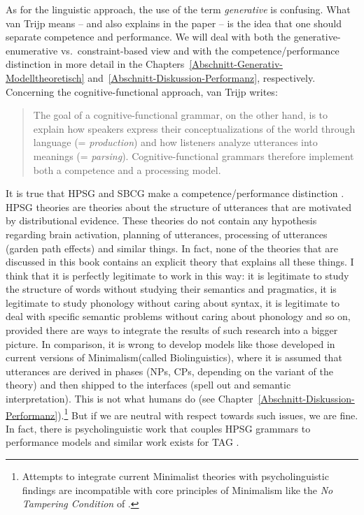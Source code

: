 \label{sec-performance-cxg}

As for the linguistic approach, the use of the term \emph{generative} is
confusing. What van Trijp means -- and also explains in the paper -- is the idea that one should
separate competence and performance. We will deal with both the generative-enumerative
vs.\ constraint-based view and with the competence/performance distinction in more detail in the
Chapters~\ref{Abschnitt-Generativ-Modelltheoretisch} and~\ref{Abschnitt-Diskussion-Performanz},
respectively. Concerning the cognitive-functional approach, van Trijp writes:
\begin{quote}
The goal of a cognitive-functional grammar, on the other hand, is to explain
how speakers express their conceptualizations of the world through language
(= \emph{production}) and how listeners analyze utterances into meanings (= \emph{parsing}).
Cognitive-functional grammars therefore implement both a competence and a
processing model. \citep[]{vanTrijp2013a}
\end{quote}
It is true that HPSG and SBCG make a competence/performance distinction \citep{SW2011a}. HPSG
theories are theories about the structure of utterances that are motivated by distributional
evidence. These theories do not contain any hypothesis regarding brain activation, planning of
utterances, processing of utterances (garden path effects) and similar things. In fact, none of the
theories that are discussed in this book contains an explicit theory that explains all these
things. I think that it is perfectly legitimate to work in this way: it is legitimate to study the
structure of words without studying their semantics and pragmatics, it is legitimate to study
phonology without caring about syntax, it is legitimate to deal with specific semantic problems
without caring about phonology and so on, provided there are ways to integrate the results of such
research into a bigger picture. In comparison, it is wrong to develop models like those developed in current
versions of Minimalism\indexmp (called Biolinguistics), where it is assumed that utterances are derived in
phases (NPs, CPs, depending on the variant of the theory) and then shipped to the interfaces (spell
out and semantic interpretation). This is not what humans do (see
Chapter~\ref{Abschnitt-Diskussion-Performanz}).\footnote{%
Attempts to integrate current Minimalist theories with psycholinguistic findings \citep{Phillips2003a} are
incompatible with core principles of Minimalism like the \emph{No Tampering Condition} of \citet{Chomsky2008a}.
}
But if we are neutral with respect towards such
issues, we are fine. In fact, there is psycholinguistic work that couples HPSG grammars to
performance models \citep{Konieczny96a-u} and similar work exists for TAG \citep{SJ93a,DK2008a-u}. 

